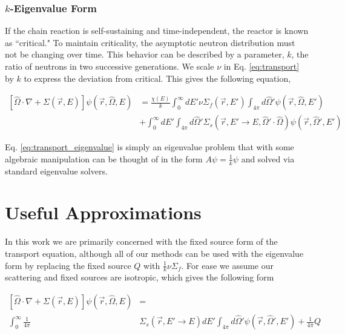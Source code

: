 \subsubsection{$k$-Eigenvalue Form}
If the chain reaction is self-sustaining and time-independent, the reactor is known as ``critical." To maintain criticality, the asymptotic neutron distribution must not be changing over time. This behavior can be described by a parameter,  $k$, the ratio of neutrons in two successive generations. We scale $\nu$ in Eq. \ref{eq:transport} by $k$ to express the deviation from critical. This gives the following equation,

\begin{equation}
    \label{eq:transport_eigenvalue}
    \begin{split}
        [\hat{\Omega} \cdot \nabla + \Sigma(\vec{r}, E)]\psi(\vec{r}, \hat{\Omega}, E) &= \frac{\chi(E)}{k} \int_0^\infty dE' \nu \Sigma_{f}(\vec{r}, E') \int_{4\pi} d\hat{\Omega}'\psi(\vec{r}, \hat{\Omega}, E') \\ &+ \int_0^\infty dE' \int_{4\pi} d\hat{\Omega}' \Sigma_s(\vec{r}, E' \rightarrow E, \hat{\Omega}' \cdot \hat{\Omega})\psi(\vec{r}, \hat{\Omega}', E') 
    \end{split}
\end{equation}

Eq. \ref{eq:transport_eigenvalue} is simply an eigenvalue problem that with some algebraic manipulation can be thought of in the form $A\psi = \frac{1}{k} \psi$ and solved via standard eigenvalue solvers. 

\section{Useful Approximations}
In this work we are primarily concerned with the fixed source form of the transport equation, although all of our methods can be used with the eigenvalue form by replacing the fixed source $Q$ with $\frac{1}{k}\nu\Sigma_f$. For ease we assume our scattering and fixed sources are isotropic, which gives the following form

\begin{equation}
\begin{split}
 [\hat{\Omega} \cdot \nabla + \Sigma(\vec{r}, E)]\psi(\vec{r}, \hat{\Omega}, E) &= \\  \int_0^\infty \frac{1}{4\pi} &\Sigma_s(\vec{r}, E' \rightarrow E)  dE' \int_{4\pi} d\hat{\Omega}'\psi(\vec{r}, \hat{\Omega}', E')  + \frac{1}{4\pi}Q 
\end{split}
 \label{eq:transport_isotropic_scattering}
\end{equation}


